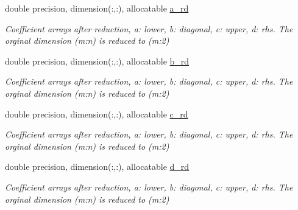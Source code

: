 \textbf{ }\par
\begin{DoxyCompactItemize}
\item 
double precision, dimension(\+:,\+:), allocatable \mbox{\hyperlink{structmodule__stdma_1_1stdma__plan__many_a19015e9b58d0978af7f588430f31416c}{a\+\_\+rd}}
\begin{DoxyCompactList}\small\item\em Coefficient arrays after reduction, a\+: lower, b\+: diagonal, c\+: upper, d\+: rhs. The orginal dimension (m\+:n) is reduced to (m\+:2) \end{DoxyCompactList}\item 
double precision, dimension(\+:,\+:), allocatable \mbox{\hyperlink{structmodule__stdma_1_1stdma__plan__many_ae91e0b0131f3355bf15e79ae10a0768c}{b\+\_\+rd}}
\begin{DoxyCompactList}\small\item\em Coefficient arrays after reduction, a\+: lower, b\+: diagonal, c\+: upper, d\+: rhs. The orginal dimension (m\+:n) is reduced to (m\+:2) \end{DoxyCompactList}\item 
double precision, dimension(\+:,\+:), allocatable \mbox{\hyperlink{structmodule__stdma_1_1stdma__plan__many_ab9430b05c4d593a1b5077be4d2d6d25d}{c\+\_\+rd}}
\begin{DoxyCompactList}\small\item\em Coefficient arrays after reduction, a\+: lower, b\+: diagonal, c\+: upper, d\+: rhs. The orginal dimension (m\+:n) is reduced to (m\+:2) \end{DoxyCompactList}\item 
double precision, dimension(\+:,\+:), allocatable \mbox{\hyperlink{structmodule__stdma_1_1stdma__plan__many_a4f6f40b879413975635c06e6d88c575b}{d\+\_\+rd}}
\begin{DoxyCompactList}\small\item\em Coefficient arrays after reduction, a\+: lower, b\+: diagonal, c\+: upper, d\+: rhs. The orginal dimension (m\+:n) is reduced to (m\+:2) \end{DoxyCompactList}\end{DoxyCompactItemize}

